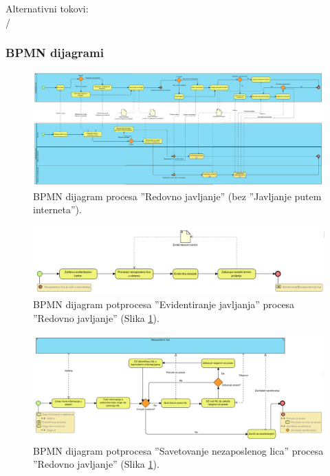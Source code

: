 \noindent Alternativni tokovi: 
\\/

\begin{mylandscape}
	\subsubsection{BPMN dijagrami}
	
	\begin{figure}[H]
		\centering
		\includegraphics[width=0.8\paperwidth]{dijagrami/bpmn-dijagrami/redovno-javljanje-bpmn.png}
		\caption{BPMN dijagram procesa ''Redovno javljanje'' (bez ''Javljanje putem interneta'').}
		\label{bpmnd: redovno javljanje}
	\end{figure}

	\newpage
	
	\begin{figure}[H]
		\centering
		\includegraphics[width=0.8\paperwidth]{dijagrami/bpmn-dijagrami/evidentiranje-javljanja.png}
		\caption{BPMN dijagram potprocesa ''Evidentiranje javljanja'' procesa ''Redovno javljanje'' (Slika \ref{bpmnd: redovno javljanje}).}
	\end{figure}

	\newpage
	
	\begin{figure}[H]
		\centering
		\includegraphics[width=0.8\paperwidth]{dijagrami/bpmn-dijagrami/savetovanje-nezaposlenog-lica.png}
		\caption{BPMN dijagram potprocesa ''Savetovanje nezaposlenog lica'' procesa ''Redovno javljanje'' (Slika \ref{bpmnd: redovno javljanje}).}
	\end{figure}
\end{mylandscape}